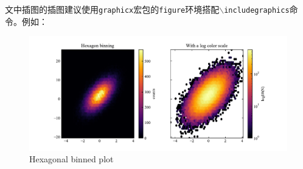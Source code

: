 文中插图的插图建议使用\texttt{graphicx}宏包的\texttt{figure}环境搭配\texttt{$\backslash$includegraphics}命令。例如：
\begin{figure}[!htp]
	\centering
	\includegraphics[width=1\textwidth]{figures/hexbin.pdf}
    {Hexagonal binned plot}
	\label{fig:hexbin}
\end{figure}
